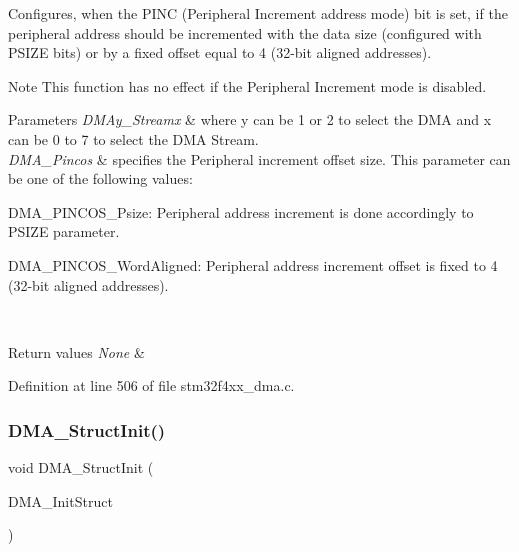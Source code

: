 Configures, when the P\+I\+NC (Peripheral Increment address mode) bit is set, if the peripheral address should be incremented with the data size (configured with P\+S\+I\+ZE bits) or by a fixed offset equal to 4 (32-\/bit aligned addresses). 

\begin{DoxyNote}{Note}
This function has no effect if the Peripheral Increment mode is disabled.
\end{DoxyNote}

\begin{DoxyParams}{Parameters}
{\em D\+M\+Ay\+\_\+\+Streamx} & where y can be 1 or 2 to select the D\+MA and x can be 0 to 7 to select the D\+MA Stream. \\
\hline
{\em D\+M\+A\+\_\+\+Pincos} & specifies the Peripheral increment offset size. This parameter can be one of the following values\+: \begin{DoxyItemize}
\item D\+M\+A\+\_\+\+P\+I\+N\+C\+O\+S\+\_\+\+Psize\+: Peripheral address increment is done accordingly to P\+S\+I\+ZE parameter. \item D\+M\+A\+\_\+\+P\+I\+N\+C\+O\+S\+\_\+\+Word\+Aligned\+: Peripheral address increment offset is fixed to 4 (32-\/bit aligned addresses). \end{DoxyItemize}
\\
\hline
\end{DoxyParams}

\begin{DoxyRetVals}{Return values}
{\em None} & \\
\hline
\end{DoxyRetVals}


Definition at line 506 of file stm32f4xx\+\_\+dma.\+c.

\mbox{\label{group___d_m_a___group1_ga0f7f95f750a90a6824f4e9b6f58adc7e}} 
\subsubsection{\texorpdfstring{D\+M\+A\+\_\+\+Struct\+Init()}{DMA\_StructInit()}}
{\footnotesize\ttfamily void D\+M\+A\+\_\+\+Struct\+Init (\begin{DoxyParamCaption}\item[{\hyperlink{struct_d_m_a___init_type_def}{D\+M\+A\+\_\+\+Init\+Type\+Def} $\ast$}]{D\+M\+A\+\_\+\+Init\+Struct }\end{DoxyParamCaption})}



